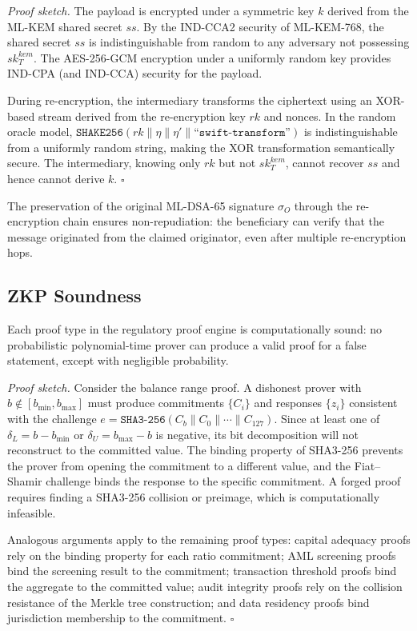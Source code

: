 \documentclass[conference,10pt]{IEEEtran}
\newcommand{\SHAKE}{\texttt{SHAKE256}}
\newcommand{\SHA}{\texttt{SHA3-256}}
\begin{document}
\textit{Proof sketch.} The payload is encrypted under a symmetric key $k$ derived from the ML-KEM shared secret $ss$. By the IND-CCA2 security of ML-KEM-768, the shared secret $ss$ is indistinguishable from random to any adversary not possessing $sk_T^{kem}$. The AES-256-GCM encryption under a uniformly random key provides IND-CPA (and IND-CCA) security for the payload.

During re-encryption, the intermediary transforms the ciphertext using an XOR-based stream derived from the re-encryption key $rk$ and nonces. In the random oracle model, $\SHAKE(rk \| \eta \| \eta' \| \texttt{``swift-transform''})$ is indistinguishable from a uniformly random string, making the XOR transformation semantically secure. The intermediary, knowing only $rk$ but not $sk_T^{kem}$, cannot recover $ss$ and hence cannot derive $k$. $\square$

The preservation of the original ML-DSA-65 signature $\sigma_O$ through the re-encryption chain ensures non-repudiation: the beneficiary can verify that the message originated from the claimed originator, even after multiple re-encryption hops.

\subsection{ZKP Soundness}

\begin{theorem}
Each proof type in the regulatory proof engine is computationally sound: no probabilistic polynomial-time prover can produce a valid proof for a false statement, except with negligible probability.
\end{theorem}

\textit{Proof sketch.} Consider the balance range proof. A dishonest prover with $b \notin [b_{\min}, b_{\max}]$ must produce commitments $\{C_i\}$ and responses $\{z_i\}$ consistent with the challenge $e = \SHA(C_b \| C_0 \| \cdots \| C_{127})$. Since at least one of $\delta_L = b - b_{\min}$ or $\delta_U = b_{\max} - b$ is negative, its bit decomposition will not reconstruct to the committed value. The binding property of SHA3-256 prevents the prover from opening the commitment to a different value, and the Fiat--Shamir challenge binds the response to the specific commitment. A forged proof requires finding a SHA3-256 collision or preimage, which is computationally infeasible.

Analogous arguments apply to the remaining proof types: capital adequacy proofs rely on the binding property for each ratio commitment; AML screening proofs bind the screening result to the commitment; transaction threshold proofs bind the aggregate to the committed value; audit integrity proofs rely on the collision resistance of the Merkle tree construction; and data residency proofs bind jurisdiction membership to the commitment. $\square$
\end{document}
